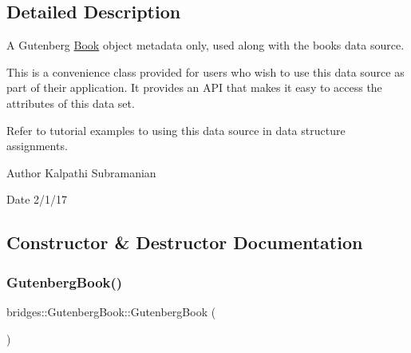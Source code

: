 \subsection{Detailed Description}
A Gutenberg \mbox{\hyperlink{classbridges_1_1_book}{Book}} object metadata only, used along with the books data source. 

This is a convenience class provided for users who wish to use this data source as part of their application. It provides an A\+PI that makes it easy to access the attributes of this data set.

Refer to tutorial examples to using this data source in data structure assignments.

\begin{DoxyAuthor}{Author}
Kalpathi Subramanian 
\end{DoxyAuthor}
\begin{DoxyDate}{Date}
2/1/17 
\end{DoxyDate}


\subsection{Constructor \& Destructor Documentation}
\mbox{\label{classbridges_1_1_gutenberg_book_a289c167dd11eed17cce39a59931f246c}} 
\subsubsection{\texorpdfstring{GutenbergBook()}{GutenbergBook()}\hspace{0.1cm}{\footnotesize\ttfamily [1/2]}}
{\footnotesize\ttfamily bridges\+::\+Gutenberg\+Book\+::\+Gutenberg\+Book (\begin{DoxyParamCaption}{ }\end{DoxyParamCaption})\hspace{0.3cm}{\ttfamily [inline]}}

\mbox{\label{classbridges_1_1_gutenberg_book_a9674a4cf8fa7cd35e640757261376793}} 
